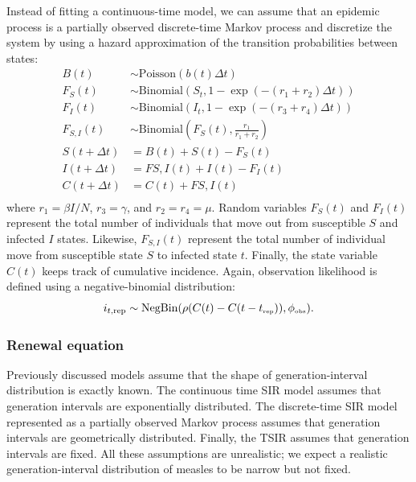 \documentclass{article}
\newcommand{\tsub}[2]{#1_{{\textrm{\tiny #2}}}}
\begin{document}
Instead of fitting a continuous-time model, we can assume that an epidemic process is a partially observed discrete-time Markov process and discretize the system by using a hazard approximation of the transition probabilities between states:
\begin{equation}
\begin{aligned}
B(t) &\sim \mathrm{Poisson}(b(t) \Delta t)\\
F_{S}(t) &\sim \mathrm{Binomial}(S_t, 1 - \exp(- (r_1 + r_2) \Delta t))\\
F_{I}(t) &\sim \mathrm{Binomial}(I_t, 1 - \exp(- (r_3 + r_4) \Delta t))\\
F_{S,I}(t) &\sim \mathrm{Binomial}\left(F_{S}(t), \frac{r_1}{r_1 + r_2}\right)\\
S(t+\Delta t) &= B(t) + S(t) - F_{S}(t) \\
I(t+\Delta t) &= F{S,I}(t) + I(t) - F_{I}(t)\\
C(t+\Delta t) &= C(t) + F{S,I}(t)\\
\end{aligned}
\end{equation}
where $r_1 = \beta I/N$, $r_3 = \gamma$, and $r_2 = r_4 = \mu$.
Random variables $F_S(t)$ and $F_I(t)$ represent the total number of individuals that move out from susceptible $S$ and infected $I$ states. Likewise, $F_{S, I}(t)$ represent the total number of individual move from susceptible state $S$ to infected state $t$.
Finally, the state variable $C(t)$ keeps track of cumulative incidence.
Again, observation likelihood is defined using a negative-binomial distribution:
\begin{equation}
i_{t, {\tiny \textrm{rep}}} \sim \mathrm{NegBin}(\rho (C(t) - C(t - \tsub{t}{rep})) , \tsub{\phi}{obs}).
\end{equation}

\subsubsection*{Renewal equation}

Previously discussed models assume that the shape of generation-interval distribution is exactly known.
The continuous time SIR model assumes that generation intervals are exponentially distributed.
The discrete-time SIR model represented as a partially observed Markov process assumes that generation intervals are geometrically distributed.
Finally, the TSIR assumes that generation intervals are fixed.
All these assumptions are unrealistic; we expect a realistic generation-interval distribution of measles to be narrow but not fixed.
\end{document}
